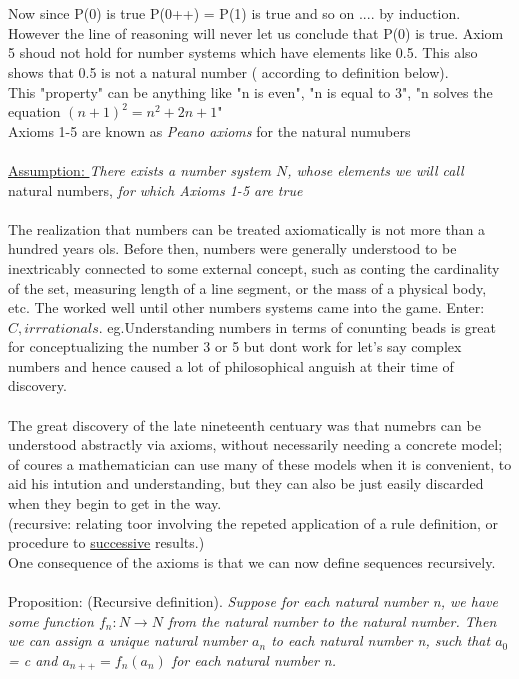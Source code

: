 \documentclass{article}
\begin{document}
\\\\Now since P(0) is true P(0++) = P(1) is true and so on .... by induction. However the line of reasoning will never let us conclude that P(0) is true. Axiom 5 shoud not hold for number systems which have elements like 0.5. This also shows that 0.5 is not a natural number ( according to definition below).
\\This "property" can be anything like "n is even", "n is equal to 3", "n solves the equation $(n+1)^{2}=n^{2}+2n+1$"
\\Axioms 1-5 are known as \emph{Peano axioms} for the natural numubers
\\\\
\underline{Assumption: }\emph{There exists a number system $N$, whose elements we will call} natural numbers, \emph{for which Axioms 1-5 are true}
\\\\The realization that numbers can be treated axiomatically is not more than a hundred years ols. Before then, numbers were generally understood to be inextricably connected to some external concept, such as conting the cardinality of the set, measuring length of a line segment, or the mass of a physical body, etc. The worked well until other numbers systems came into the game. Enter: $C,irrrationals.$
eg.Understanding numbers in terms of conunting beads is great for conceptualizing the number 3 or 5 but dont work for let's say complex numbers and hence caused a lot of philosophical anguish at their time of discovery.
\\\\The great discovery of the late nineteenth centuary was that numebrs can be understood abstractly via axioms, without necessarily needing a concrete model; of coures a mathematician can use many of these models when it is convenient, to aid his intution and understanding, but they can also be just easily discarded when they begin to get in the way.
\\(recursive: relating toor involving the repeted application of a rule definition, or procedure to \underline{successive} results.)
\\One  consequence of the axioms is that we can now define sequences recursively.
\\\\Proposition: (Recursive definition). \emph{Suppose for each natural number n, we have some function $f_{n}:N\rightarrow N$ from the natural number to the natural number. Then we can assign a unique natural number $a_{n}$ to each natural number n, such that $a_{0}$ = c and $a_{n++}=f_{n}(a_{n})$ for each natural number n.}
\end{document}
